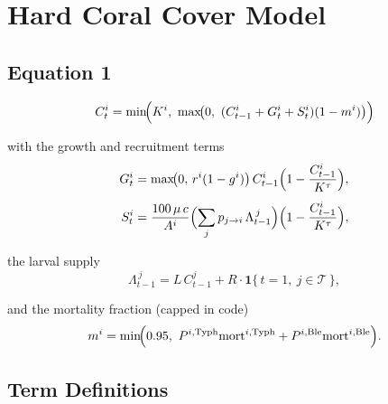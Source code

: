 \documentclass{article}
\begin{document}
\section*{Hard Coral Cover Model}



\subsection*{Equation 1}

\begin{equation*}
C_t^{i} = \min\!\Bigl(K^{i},\ \max\!\bigl(0,\ (C_{t-1}^{i} + G_t^{i} + S_t^{i})(1-m^{i})\bigr)\Bigr)
\end{equation*}

with the growth and recruitment terms
\begin{align*}
G_t^{i} &= \max\!\bigl(0,\,r^{i}(1-g^{i})\bigr)\,C_{t-1}^{i}\Bigl(1-\frac{C_{t-1}^{i}}{K^{\tau}}\Bigr), \\[4pt]
S_t^{i} &= \frac{100\,\mu\,c}{A^{i}}
   \Bigl(\sum_{j} p_{j\to i}\,\Lambda_{t-1}^{\,j}\Bigr)
   \Bigl(1-\frac{C_{t-1}^{i}}{K^{\tau}}\Bigr),
\end{align*}

the larval supply
\begin{equation*}
\Lambda_{t-1}^{\,j} = L\,C_{t-1}^{j}
+ R\cdot \mathbf{1}\{\,t=1,\ j\in\mathcal{T}\,\},
\end{equation*}

and the mortality fraction (capped in code)
\begin{equation*}
m^{i} = \min\!\Bigl(0.95,\
P^{i,\mathrm{Typh}}\mathrm{mort}^{i,\mathrm{Typh}}
+ P^{i,\mathrm{Ble}}\mathrm{mort}^{i,\mathrm{Ble}}\Bigr).
\end{equation*}
\subsection*{Term Definitions}
\end{document}
